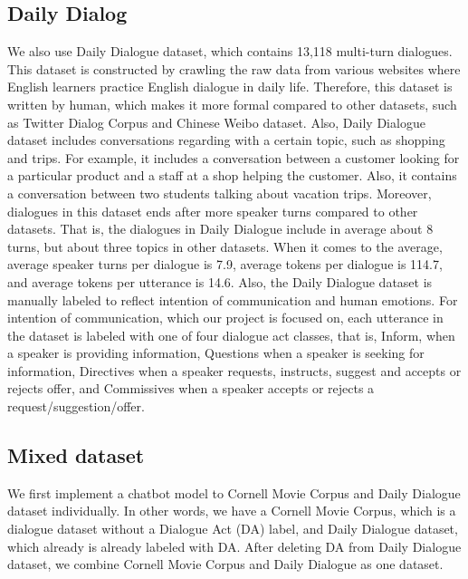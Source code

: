 \documentclass[11pt,a4paper]{article}
\begin{document}
\subsection{Daily Dialog}
We also use Daily Dialogue dataset, which contains 13,118 multi-turn dialogues. This dataset is constructed by crawling the raw data from various websites where English learners practice English dialogue in daily life.  Therefore, this dataset is written by human, which makes it more formal compared to other datasets, such as Twitter Dialog Corpus and Chinese Weibo dataset. Also, Daily Dialogue dataset includes conversations regarding with a certain topic, such as shopping and trips. For example, it includes a conversation between a customer looking for a particular product and a staff at a shop helping the customer. Also, it contains a conversation between two students talking about vacation trips. Moreover, dialogues in this dataset ends after more speaker turns compared to other datasets. That is, the dialogues in Daily Dialogue include in average about 8 turns, but about three topics in other datasets. When it comes to the average, average speaker turns per dialogue is 7.9, average tokens per dialogue is 114.7, and average tokens per utterance is 14.6. 
Also, the Daily Dialogue dataset is manually labeled to reflect intention of communication and human emotions. For intention of communication, which our project is focused on, each utterance in the dataset is labeled with one of four dialogue act classes, that is, Inform, when a speaker is providing information, Questions when a speaker is seeking for information, Directives when a speaker requests, instructs, suggest and accepts or rejects offer, and Commissives when a speaker accepts or rejects a request/suggestion/offer.

\subsection{Mixed dataset}

We first implement a chatbot model to Cornell Movie Corpus and Daily Dialogue dataset individually. In other words, we have a Cornell Movie Corpus, which is a dialogue dataset without a Dialogue Act (DA) label, and Daily Dialogue dataset, which already is already labeled with DA. After deleting DA from Daily Dialogue dataset, we combine Cornell Movie Corpus and Daily Dialogue as one dataset. 
\end{document}
